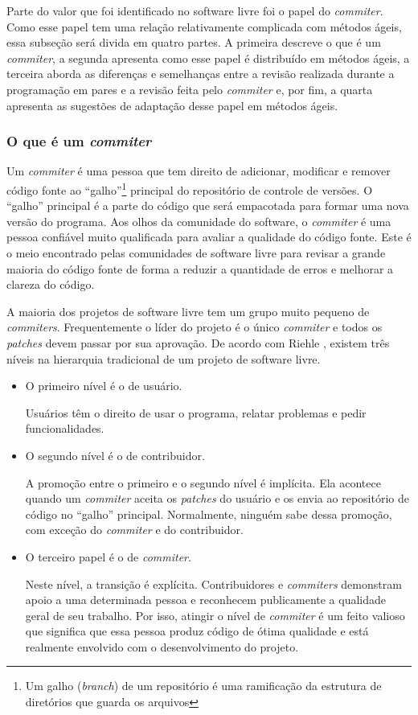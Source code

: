 Parte do valor que foi identificado no software livre foi o papel do
\emph{commiter}. Como esse papel tem uma relação relativamente
complicada com métodos ágeis, essa subseção será divida em quatro
partes. A primeira descreve o que é um \emph{commiter}, a segunda
apresenta como esse papel é distribuído em métodos ágeis, a terceira
aborda as diferenças e semelhanças entre a revisão realizada durante a
programação em pares e a revisão feita pelo \emph{commiter} e, por
fim, a quarta apresenta as sugestões de adaptação desse papel em
métodos ágeis.


\subsubsection{O que é um \emph{commiter}}

Um \emph{commiter} é uma pessoa que tem direito de adicionar,
modificar e remover código fonte ao ``galho''\footnote{Um galho
  (\emph{branch}) de um repositório é uma ramificação da estrutura de
  diretórios que guarda os arquivos} principal do repositório de
controle de versões. O ``galho'' principal é a parte do código que
será empacotada para formar uma nova versão do programa. Aos olhos da
comunidade do software, o \emph{commiter} é uma pessoa confiável muito
qualificada para avaliar a qualidade do código fonte. Este é o meio
encontrado pelas comunidades de software livre para revisar a grande
maioria do código fonte de forma a reduzir a quantidade de erros e
melhorar a clareza do código.

A maioria dos projetos de software livre tem um grupo muito pequeno de
\emph{commiters}. Frequentemente o líder do projeto é o único
\emph{commiter} e todos os \emph{patches} devem passar por sua
aprovação. De acordo com Riehle \cite{Riehle2007}, existem três níveis
na hierarquia tradicional de um projeto de software livre.
\begin{itemize}
\item O primeiro nível é o de usuário.

  Usuários têm o direito de usar o programa, relatar problemas e pedir
  funcionalidades.
\item O segundo nível é o de contribuidor.

  A promoção entre o primeiro e o segundo nível é implícita. Ela
  acontece quando um \emph{commiter} aceita os \emph{patches} do
  usuário e os envia ao repositório de código no ``galho''
  principal. Normalmente, ninguém sabe dessa promoção, com exceção do
  \emph{commiter} e do contribuidor.
\item O terceiro papel é o de \emph{commiter}.

  Neste nível, a transição é explícita. Contribuidores e
  \emph{commiters} demonstram apoio a uma determinada pessoa e
  reconhecem publicamente a qualidade geral de seu trabalho. Por isso,
  atingir o nível de \emph{commiter} é um feito valioso que significa
  que essa pessoa produz código de ótima qualidade e está realmente
  envolvido com o desenvolvimento do projeto.
\end{itemize}

